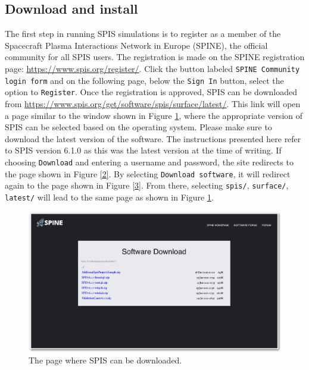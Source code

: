 \documentclass[a4paper, 12pt]{article}
\begin{document}
\subsection{Download and install}
\vspace{2mm}

The first step in running SPIS simulations is to register as a member of the Spacecraft Plasma Interactions Network in Europe (SPINE), the official community for all SPIS users. The registration is made on the SPINE registration page: \url{https://www.spis.org/register/}. Click the button labeled \verb|SPINE Community login form| and on the following page, below the \verb|Sign In| button, select the option to \verb|Register|. Once the registration is approved, SPIS can be downloaded from \url{https://www.spis.org/get/software/spis/surface/latest/}. This link will open a page similar to the window shown in Figure \ref{1}, where the appropriate version of SPIS can be selected based on the operating system. Please make sure to download the latest version of the software. The instructions presented here refer to SPIS version 6.1.0 as this was the latest version at the time of writing. If choosing \verb|Download| and entering a username and password, the site redirects to the page shown in Figure \ref{2}. By selecting \verb|Download software|, it will redirect again to the page shown in Figure \ref{3}. From there, selecting \verb|spis/|, \verb|surface/|, \verb|latest/| will lead to the same page as shown in Figure \ref{1}.\\

\begin{figure}[!ht]
    \centering
    \includegraphics[width=1\textwidth]{fig1.jpg}
    \caption{The page where SPIS can be downloaded.}
    \label{1}
\end{figure}
\end{document}
